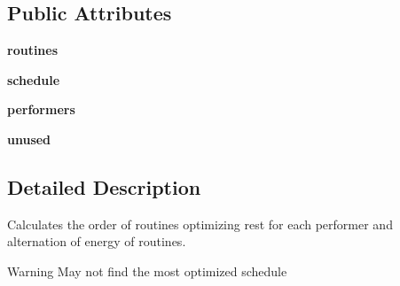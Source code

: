 \subsection*{Public Attributes}
\begin{DoxyCompactItemize}
\item 
\hypertarget{classdance__scheduler_1_1Scheduler_a71a9ce8deff19fae6e2db24d9e8ed27d}{{\bfseries routines}}\label{classdance__scheduler_1_1Scheduler_a71a9ce8deff19fae6e2db24d9e8ed27d}

\item 
\hypertarget{classdance__scheduler_1_1Scheduler_a40481e815da8a273c308bd5f9e04d053}{{\bfseries schedule}}\label{classdance__scheduler_1_1Scheduler_a40481e815da8a273c308bd5f9e04d053}

\item 
\hypertarget{classdance__scheduler_1_1Scheduler_a1bcc31b6dbbdbec8d69be8183919321b}{{\bfseries performers}}\label{classdance__scheduler_1_1Scheduler_a1bcc31b6dbbdbec8d69be8183919321b}

\item 
\hypertarget{classdance__scheduler_1_1Scheduler_a6e515530df653f341e9e00131744f51e}{{\bfseries unused}}\label{classdance__scheduler_1_1Scheduler_a6e515530df653f341e9e00131744f51e}

\end{DoxyCompactItemize}


\subsection{Detailed Description}
Calculates the order of routines optimizing rest for each performer and alternation of energy of routines. 

\begin{DoxyWarning}{Warning}
May not find the most optimized schedule 
\end{DoxyWarning}



